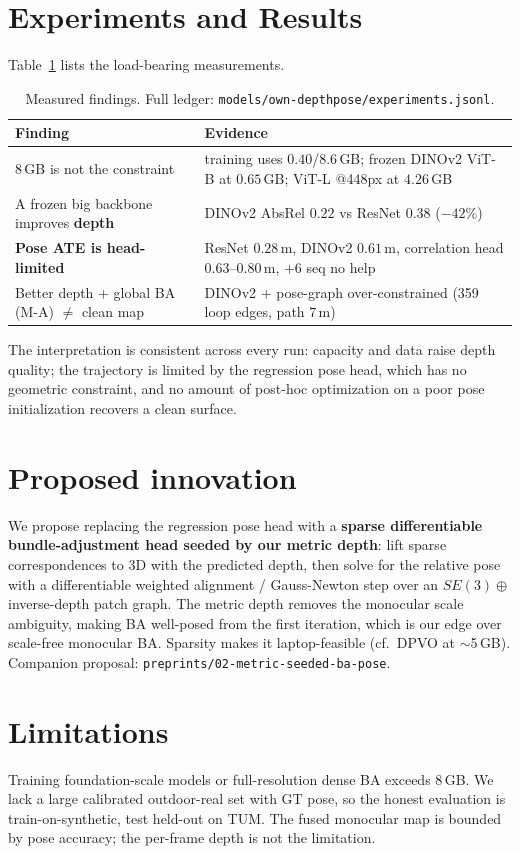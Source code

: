 \documentclass[10pt,twocolumn]{article}
\begin{document}
\section{Experiments and Results}
Table~\ref{tab:findings} lists the load-bearing measurements.
\begin{table}[t]\centering\small
\begin{tabular}{@{}p{4.6cm}p{2.6cm}@{}}
\toprule
Finding & Evidence \\ \midrule
8\,GB is not the constraint & training uses $0.40$/$8.6$\,GB; frozen DINOv2 ViT-B at $0.65$\,GB; ViT-L @448px at $4.26$\,GB \\
A frozen big backbone improves \textbf{depth} & DINOv2 AbsRel $0.22$ vs ResNet $0.38$ ($-42\%$) \\
\textbf{Pose ATE is head-limited} & ResNet $0.28$\,m, DINOv2 $0.61$\,m, correlation head $0.63$--$0.80$\,m, $+6$ seq no help \\
Better depth + global BA (M-A) $\ne$ clean map & DINOv2 + pose-graph over-constrained (359 loop edges, path $7$\,m) \\
\bottomrule
\end{tabular}
\caption{Measured findings. Full ledger: \texttt{models/own-depthpose/experiments.jsonl}.}
\label{tab:findings}
\end{table}
The interpretation is consistent across every run: capacity and data raise depth quality; the trajectory is limited
by the regression pose head, which has no geometric constraint, and no amount of post-hoc optimization on a poor
pose initialization recovers a clean surface.

\section{Proposed innovation}
We propose replacing the regression pose head with a \textbf{sparse differentiable bundle-adjustment head seeded by
our metric depth}: lift sparse correspondences to 3D with the predicted depth, then solve for the relative pose with
a differentiable weighted alignment / Gauss-Newton step over an $SE(3)\oplus$ inverse-depth patch graph. The metric
depth removes the monocular scale ambiguity, making BA well-posed from the first iteration, which is our edge over
scale-free monocular BA. Sparsity makes it laptop-feasible (cf.\ DPVO at $\sim$5\,GB). Companion proposal:
\texttt{preprints/02-metric-seeded-ba-pose}.

\section{Limitations}
Training foundation-scale models or full-resolution dense BA exceeds 8\,GB. We lack a large calibrated outdoor-real
set with GT pose, so the honest evaluation is train-on-synthetic, test held-out on TUM. The fused monocular map is
bounded by pose accuracy; the per-frame depth is not the limitation.
\end{document}
